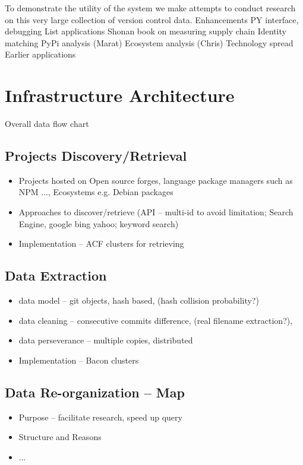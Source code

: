 \documentclass[conference]{IEEEtran}
\begin{document}
To demonstrate the utility of the system we make attempts to conduct research on this very large collection of version control data. 
Enhancements
PY interface, debugging
List applications
Shonan book on measuring supply chain
Identity matching
PyPi analysis (Marat)
Ecosystem analysis (Chris)
Technology spread
Earlier applications~\cite{MNHAM13}



\section{Infrastructure Architecture}
Overall data flow chart
\subsection{Projects Discovery/Retrieval}
\begin{itemize}
    \item Projects hosted on Open source forges, language package managers such as NPM ..., Ecosystems e.g. Debian packages
    \item Approaches to discover/retrieve (API -- multi-id to avoid limitation; Search Engine, google bing yahoo; keyword search)
    \item Implementation -- ACF clusters for retrieving
\end{itemize}

\subsection{Data Extraction}
\begin{itemize}
    \item data model -- git objects, hash based, (hash collision probability?)
    \item data cleaning -- consecutive commits difference, (real filename extraction?), 
    \item data perseverance -- multiple copies, distributed
    \item Implementation -- Bacon clusters
\end{itemize}

\subsection{Data Re-organization -- Map}
\begin{itemize}
    \item Purpose -- facilitate research, speed up query
    \item Structure and Reasons
    \item ...
\end{itemize}
\end{document}
